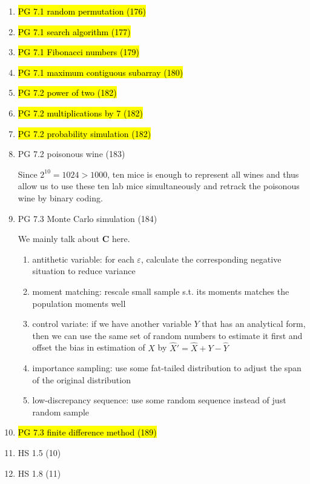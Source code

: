 \documentclass[11pt]{article}
\newcommand{\bs}{\boldsymbol}
\renewcommand{\epsilon}{\varepsilon}
\newenvironment{note}{\begin{enumerate}[leftmargin=1em,topsep=0pt,noitemsep]}{\end{enumerate}}
\newenvironment{nnote}{\begin{enumerate}[leftmargin=.95em,topsep=0pt,noitemsep,label=$\bs{\cdot}$]}{\end{enumerate}}
\newcommand{\solution}{\boxed{\textbf{SOLUTION}}\hspace{.5em}}
\begin{document}
\begin{spacing}{1.1}
\begin{note}
\item \hl{PG 7.1 random permutation (176)}

\item \hl{PG 7.1 search algorithm (177)}

\item \hl{PG 7.1 Fibonacci numbers (179)}

\item \hl{PG 7.1 maximum contiguous subarray (180)}

\item \hl{PG 7.2 power of two (182)}

\item \hl{PG 7.2 multiplications by $7$ (182)}

\item \hl{PG 7.2 probability simulation (182)}

\item PG 7.2 poisonous wine (183)

\solution Since $2^10=1024>1000$, ten mice is enough to represent all wines and thus allow us to use these ten lab mice simultaneously and retrack the poisonous wine by binary coding.

\item PG 7.3 Monte Carlo simulation (184)

\solution We mainly talk about \textbf{C} here. 
\begin{nnote}
\item antithetic variable: for each $\epsilon$, calculate the corresponding negative situation to reduce variance
\item moment matching: rescale small sample s.t. its moments matches the population moments well
\item control variate: if we have another variable $Y$ that has an analytical form, then we can use the same set of random numbers to estimate it first and offset the bias in estimation of $X$ by $\hat{X}' = \hat{X} + Y - \hat{Y}$
\item importance sampling: use some fat-tailed distribution to adjust the span of the original distribution
\item low-discrepancy sequence: use some random sequence instead of just random sample
\end{nnote}

\item \hl{PG 7.3 finite difference method (189)}

\item HS 1.5 (10)

\item HS 1.8 (11)


\end{note}
\end{spacing}
\end{document}
